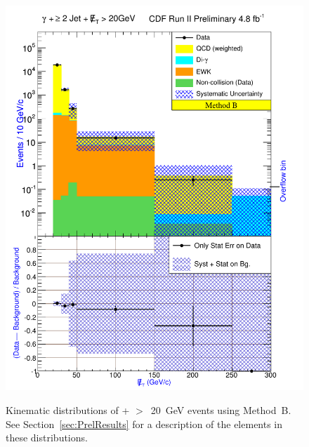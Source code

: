 \documentclass[12pt,twoside,letterpaper,doublespace]{article}
\begin{document}
\begin{figure}[h!]
\centering
\caption[Method B \phoonejet]{Kinematic distributions of \photwojet + \met$>$~20~GeV events using \mbox{Method B}. See Section~\ref{sec:PrelResults} for a description of the elements in these distributions.}
{\includegraphics[keepaspectratio=true, scale=\figScale]{G30JetsMet20_MtdB_plot2_Met.pdf}}
\label{fig:pjmetMtdBSetFour}
\end{figure}
\end{document}

